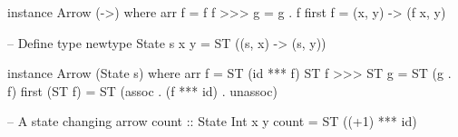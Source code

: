 \begin{frame}[fragile]
\begin{example}
\begin{code}
instance Arrow (->) where
    arr f   = f
    f >>> g = g . f
    first f = (x, y) -> (f x, y)
\end{code}
\end{example}
\end{frame}

\begin{frame}[fragile]
\begin{example}
\begin{code}
-- Define type
newtype State s x y = ST ((s, x) -> (s, y))

instance Arrow (State s) where
    arr f         = ST (id *** f)
    ST f >>> ST g = ST (g . f)
    first (ST f)  = ST (assoc . (f *** id) . unassoc)

-- A state changing arrow
count :: State Int x y
count = ST ((+1) *** id)
\end{code}
\end{example}
\end{frame}
